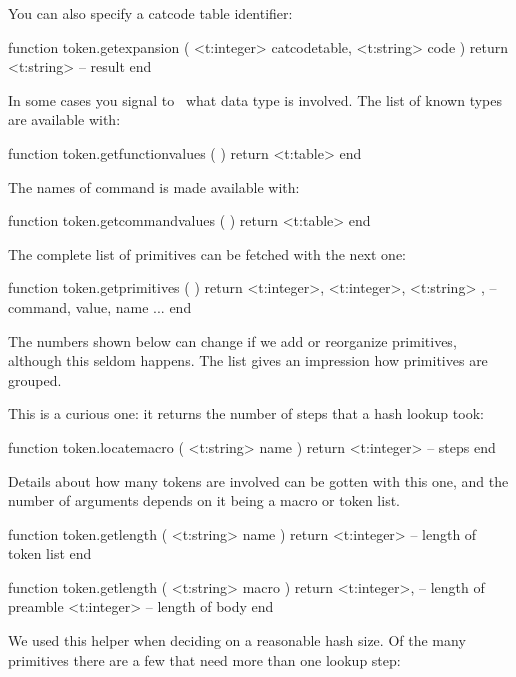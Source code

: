 You can also specify a catcode table identifier:

\starttyping[option=LUA]
function token.getexpansion (
    <t:integer> catcodetable,
    <t:string>  code
)
    return <t:string> -- result
end
\stoptyping

\stopsubsection

\startsubsection[title={Information}]

In some cases you signal to \LUA\ what data type is involved. The list of known
types are available with:

\starttyping[option=LUA]
function token.getfunctionvalues ( )
    return <t:table>
end
\stoptyping

\startthreerows
{}
\stopthreerows

The names of command is made available with:

\starttyping[option=LUA]
function token.getcommandvalues ( )
    return <t:table>
end
\stoptyping

\starttworows
{}
\stoptworows

The complete list of primitives can be fetched with the next one:

\starttyping[option=LUA]
function token.getprimitives ( )
    return {
        { <t:integer>, <t:integer>, <t:string> }, -- command, value, name
        ...
    }
end
\stoptyping

The numbers shown below can change if we add or reorganize primitives, although
this seldom happens. The list gives an impression how primitives are grouped.

\showengineprimitives[2]

This is a curious one: it returns the number of steps that a hash lookup took:

\starttyping[option=LUA]
function token.locatemacro ( <t:string> name )
    return <t:integer> -- steps
end
\stoptyping

Details about how many tokens are involved can be gotten with this one, and the
number of arguments depends on it being a macro or token list.

\starttyping[option=LUA]
function token.getlength ( <t:string> name )
    return
        <t:integer> -- length of token list
end

function token.getlength ( <t:string> macro )
    return
        <t:integer>, -- length of preamble
        <t:integer>  -- length of body
end
\stoptyping

We used this helper when deciding on a reasonable hash size. Of the many
primitives there are a few that need more than one lookup step:

